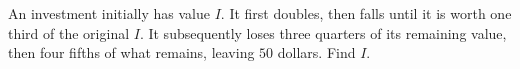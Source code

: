 An investment initially has value $I$. It first doubles, then falls until it is worth one third of the original $I$. It subsequently loses three quarters of its remaining value, then four fifths of what remains, leaving $50$ dollars. Find $I$.
